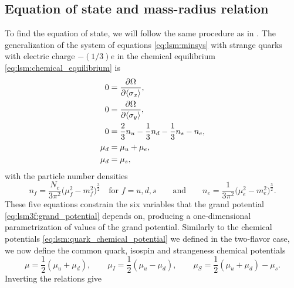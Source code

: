 


\subsection{Equation of state and mass-radius relation}

To find the equation of state,
we will follow the same procedure as in .
The generalization of the system of equations \eqref{eq:lsm:minsys} with strange quarks with electric charge $-(1/3)e$ in the chemical equilibrium \eqref{eq:lsm:chemical_equilibrium} is
\begin{subequations}
\begin{align}
	0 &= \pdv{\Omega}{ \langle \sigma_x \rangle}, \\
	0 &= \pdv{\Omega}{ \langle \sigma_y \rangle}, \\
	0 &= \frac23 n_u - \frac13 n_d - \frac13 n_s - n_e, \\
	\mu_d &= \mu_u + \mu_e, \\
	\mu_d &= \mu_s,
\end{align}%
\label{eq:lsm3f:minsys}%
\end{subequations}%
with the particle number densities
\begin{equation}
	n_f = \frac{N_c}{3\pi^2} \Big(\mu_f^2 - m_f^2\Big)^{\frac32} \quad \text{for $f = u,d,s$}
	\qquad \text{and} \qquad
	n_e = \frac{  1}{3\pi^2} \Big(\mu_e^2 - m_e^2\Big)^{\frac32}.
\label{eq:lsm3f:particle_densities}
\end{equation}
These five equations constrain the six variables that the grand potential \eqref{eq:lsm3f:grand_potential} depends on,
producing a one-dimensional parametrization of values of the grand potential.
Similarly to the chemical potentials \eqref{eq:lsm:quark_chemical_potential} we defined in the two-flavor case,
we now define the common quark, isospin and strangeness chemical potentials
\begin{equation}
	\mu = \frac12 (\mu_u + \mu_d), \qquad
	\mu_I = \frac12 (\mu_u - \mu_d), \qquad
	\mu_S = \frac12 (\mu_u + \mu_d) - \mu_s.
\end{equation}
Inverting the relations give
